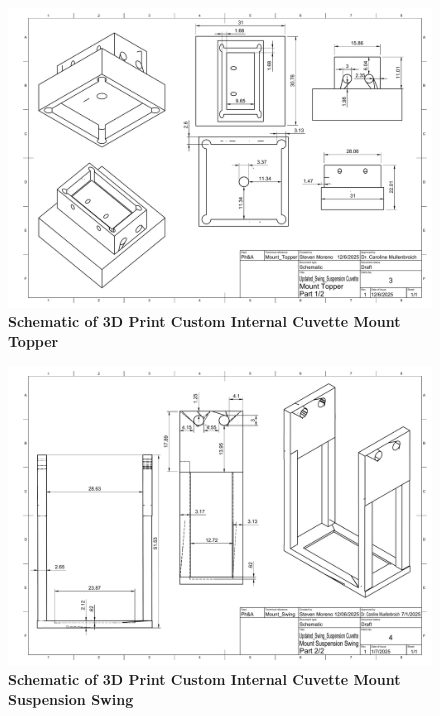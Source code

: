     \begin{figure}[H]
        \centering
        \includegraphics[width=1\linewidth]{Figures/Updated_Swing_Suspension Cuvette Topper Drawing v1.pdf}
        \caption{\textbf{Schematic of 3D Print Custom Internal Cuvette Mount Topper}}
        \label{fig:enter-label}
    \end{figure}

 \begin{figure}[H]
        \centering
        \includegraphics[width=1\linewidth]{Figures/Updated_Swing_Suspension Cuvette Swing v1.pdf}
        \caption{\textbf{Schematic of 3D Print Custom Internal Cuvette Mount Suspension Swing}}
        \label{fig:enter-label}
    \end{figure}
    
\vspace{0.5\textheight}

